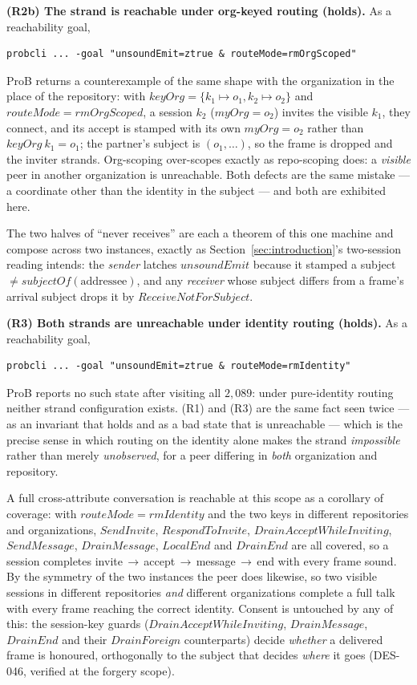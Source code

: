 \documentclass[a4paper,10pt,fleqn]{article}
\begin{document}
\medskip\noindent\textbf{(R2b) The strand is reachable under org-keyed
routing (holds).}  As a reachability goal,

\begin{verbatim}
probcli ... -goal "unsoundEmit=ztrue & routeMode=rmOrgScoped"
\end{verbatim}

ProB returns a counterexample of the same shape with the organization in
the place of the repository: with $keyOrg = \{k_1 \mapsto o_1,
k_2 \mapsto o_2\}$ and $routeMode = rmOrgScoped$, a session $k_2$
($myOrg = o_2$) invites the visible $k_1$, they connect, and its accept
is stamped with its own $myOrg = o_2$ rather than $keyOrg~k_1 = o_1$;
the partner's subject is $(o_1, \ldots)$, so the frame is dropped and the
inviter strands.  Org-scoping over-scopes exactly as repo-scoping does:
a \emph{visible} peer in another organization is unreachable.  Both
defects are the same mistake --- a coordinate other than the identity in
the subject --- and both are exhibited here.

The two halves of ``never receives'' are each a theorem of this one
machine and compose across two instances, exactly as
Section~\ref{sec:introduction}'s two-session reading intends: the
\emph{sender} latches $unsoundEmit$ because it stamped a subject
$\neq subjectOf(\mathrm{addressee})$, and any \emph{receiver} whose
subject differs from a frame's arrival subject drops it by
$ReceiveNotForSubject$.

\medskip\noindent\textbf{(R3) Both strands are unreachable under
identity routing (holds).}  As a reachability goal,

\begin{verbatim}
probcli ... -goal "unsoundEmit=ztrue & routeMode=rmIdentity"
\end{verbatim}

ProB reports no such state after visiting all $2{,}089$: under
pure-identity routing neither strand configuration exists.  (R1) and
(R3) are the same fact seen twice --- as an invariant that holds and as
a bad state that is unreachable --- which is the precise sense in which
routing on the identity alone makes the strand \emph{impossible} rather
than merely \emph{unobserved}, for a peer differing in \emph{both}
organization and repository.

A full cross-attribute conversation is reachable at this scope as a
corollary of coverage: with $routeMode = rmIdentity$ and the two keys in
different repositories and organizations, $SendInvite$,
$RespondToInvite$, $DrainAcceptWhileInviting$, $SendMessage$,
$DrainMessage$, $LocalEnd$ and $DrainEnd$ are all covered, so a session
completes
invite\,$\rightarrow$\,accept\,$\rightarrow$\,message\,$\rightarrow$\,end
with every frame sound.  By the symmetry of the two instances the peer
does likewise, so two visible sessions in different repositories
\emph{and} different organizations complete a full talk with every frame
reaching the correct identity.  Consent is untouched by any of this: the
session-key guards ($DrainAcceptWhileInviting$, $DrainMessage$,
$DrainEnd$ and their $DrainForeign$ counterparts) decide \emph{whether} a
delivered frame is honoured, orthogonally to the subject that decides
\emph{where} it goes (DES-046, verified at the forgery scope).
\end{document}
